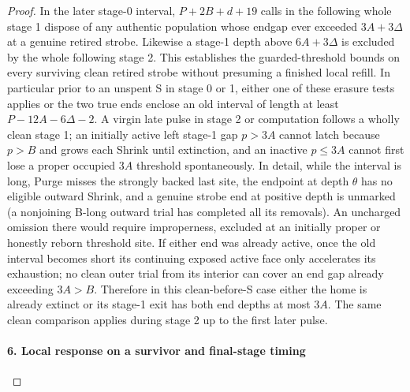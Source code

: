 \begin{proof}
In the later stage-0 interval, \(P+2B+d+19\) calls in the following whole stage 1 dispose of any authentic population whose endgap ever exceeded \(3A+3\Delta \) at a genuine retired strobe. Likewise a stage-1 depth above \(6A+3\Delta \) is excluded by the whole following stage 2. This establishes the guarded-threshold bounds on every surviving clean retired strobe without presuming a finished local refill. In particular prior to an unspent S in stage 0 or 1, either one of these erasure tests applies or the two true ends enclose an old interval of length at least \(P- 12A- 6\Delta - 2\). A virgin late pulse in stage 2 or computation follows a wholly clean stage 1; an initially active left stage-1 gap \(p>3A\) cannot latch because \(p>B\) and grows each Shrink until extinction, and an inactive \(p\le 3A\) cannot first lose a proper occupied \(3A\) threshold spontaneously. In detail, while the interval is long, Purge misses the strongly backed last site, the endpoint at depth \(\theta\) has no eligible outward Shrink, and a genuine strobe end at positive depth is unmarked (a nonjoining B-long outward trial has completed all its removals). An uncharged omission there would require improperness, excluded at an initially proper or honestly reborn threshold site. If either end was already active, once the old interval becomes short its continuing exposed active face only accelerates its exhaustion; no clean outer trial from its interior can cover an end gap already exceeding \(3A>B\). Therefore in this clean-before-S case either the home is already extinct or its stage-1 exit has both end depths at most \(3A\). The same clean comparison applies during stage 2 up to the first later pulse.

\paragraph{6. Local response on a survivor and final-stage timing}


\end{proof}
